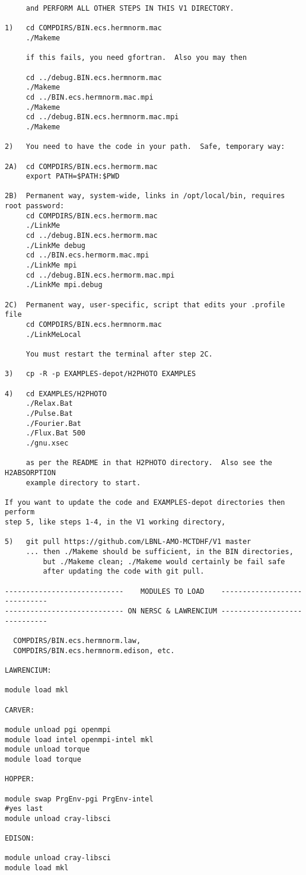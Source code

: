 \begin{verbatim}
     and PERFORM ALL OTHER STEPS IN THIS V1 DIRECTORY.

1)   cd COMPDIRS/BIN.ecs.hermnorm.mac
     ./Makeme

     if this fails, you need gfortran.  Also you may then

     cd ../debug.BIN.ecs.hermnorm.mac
     ./Makeme
     cd ../BIN.ecs.hermnorm.mac.mpi
     ./Makeme
     cd ../debug.BIN.ecs.hermnorm.mac.mpi
     ./Makeme

2)   You need to have the code in your path.  Safe, temporary way:

2A)  cd COMPDIRS/BIN.ecs.hermorm.mac
     export PATH=$PATH:$PWD

2B)  Permanent way, system-wide, links in /opt/local/bin, requires root password:
     cd COMPDIRS/BIN.ecs.hermorm.mac
     ./LinkMe
     cd ../debug.BIN.ecs.hermorm.mac
     ./LinkMe debug
     cd ../BIN.ecs.hermorm.mac.mpi
     ./LinkMe mpi
     cd ../debug.BIN.ecs.hermorm.mac.mpi
     ./LinkMe mpi.debug

2C)  Permanent way, user-specific, script that edits your .profile file
     cd COMPDIRS/BIN.ecs.hermnorm.mac
     ./LinkMeLocal

     You must restart the terminal after step 2C.

3)   cp -R -p EXAMPLES-depot/H2PHOTO EXAMPLES

4)   cd EXAMPLES/H2PHOTO
     ./Relax.Bat
     ./Pulse.Bat
     ./Fourier.Bat 
     ./Flux.Bat 500
     ./gnu.xsec

     as per the README in that H2PHOTO directory.  Also see the H2ABSORPTION
     example directory to start.
 
If you want to update the code and EXAMPLES-depot directories then perform 
step 5, like steps 1-4, in the V1 working directory,

5)   git pull https://github.com/LBNL-AMO-MCTDHF/V1 master
     ... then ./Makeme should be sufficient, in the BIN directories,
         but ./Makeme clean; ./Makeme would certainly be fail safe
         after updating the code with git pull.

----------------------------    MODULES TO LOAD    -----------------------------
---------------------------- ON NERSC & LAWRENCIUM -----------------------------

  COMPDIRS/BIN.ecs.hermnorm.law, 
  COMPDIRS/BIN.ecs.hermnorm.edison, etc.

LAWRENCIUM:

module load mkl

CARVER:

module unload pgi openmpi
module load intel openmpi-intel mkl
module unload torque
module load torque

HOPPER:

module swap PrgEnv-pgi PrgEnv-intel
#yes last
module unload cray-libsci

EDISON:

module unload cray-libsci
module load mkl

\end{verbatim}
